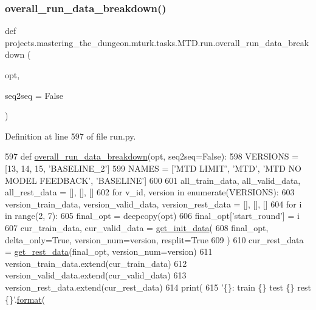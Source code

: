 \subsubsection{\texorpdfstring{overall\+\_\+run\+\_\+data\+\_\+breakdown()}{overall\_run\_data\_breakdown()}}
{\footnotesize\ttfamily def projects.\+mastering\+\_\+the\+\_\+dungeon.\+mturk.\+tasks.\+M\+T\+D.\+run.\+overall\+\_\+run\+\_\+data\+\_\+breakdown (\begin{DoxyParamCaption}\item[{}]{opt,  }\item[{}]{seq2seq = {\ttfamily False} }\end{DoxyParamCaption})}



Definition at line 597 of file run.\+py.


\begin{DoxyCode}
597 \textcolor{keyword}{def }\hyperlink{namespaceprojects_1_1mastering__the__dungeon_1_1mturk_1_1tasks_1_1MTD_1_1run_aec4fee521da5b1a9373636c337af064c}{overall\_run\_data\_breakdown}(opt, seq2seq=False):
598     VERSIONS = [13, 14, 15, \textcolor{stringliteral}{'BASELINE\_2'}]
599     NAMES = [\textcolor{stringliteral}{'MTD LIMIT'}, \textcolor{stringliteral}{'MTD'}, \textcolor{stringliteral}{'MTD NO MODEL FEEDBACK'}, \textcolor{stringliteral}{'BASELINE'}]
600 
601     all\_train\_data, all\_valid\_data, all\_rest\_data = [], [], []
602     \textcolor{keywordflow}{for} v\_id, version \textcolor{keywordflow}{in} enumerate(VERSIONS):
603         version\_train\_data, version\_valid\_data, version\_rest\_data = [], [], []
604         \textcolor{keywordflow}{for} i \textcolor{keywordflow}{in} range(2, 7):
605             final\_opt = deepcopy(opt)
606             final\_opt[\textcolor{stringliteral}{'start\_round'}] = i
607             cur\_train\_data, cur\_valid\_data = \hyperlink{namespaceprojects_1_1mastering__the__dungeon_1_1mturk_1_1tasks_1_1MTD_1_1run_ae84843b54586b020d47c60d95340e1d7}{get\_init\_data}(
608                 final\_opt, delta\_only=\textcolor{keyword}{True}, version\_num=version, resplit=\textcolor{keyword}{True}
609             )
610             cur\_rest\_data = \hyperlink{namespaceprojects_1_1mastering__the__dungeon_1_1mturk_1_1tasks_1_1MTD_1_1run_ae9acbe1fe240a624b01fed3f073cc780}{get\_rest\_data}(final\_opt, version\_num=version)
611             version\_train\_data.extend(cur\_train\_data)
612             version\_valid\_data.extend(cur\_valid\_data)
613             version\_rest\_data.extend(cur\_rest\_data)
614         print(
615             \textcolor{stringliteral}{'\{\}: train \{\} test \{\} rest \{\}'}.\hyperlink{namespaceparlai_1_1chat__service_1_1services_1_1messenger_1_1shared__utils_a32e2e2022b824fbaf80c747160b52a76}{format}(

\end{DoxyCode}
